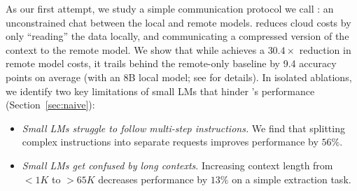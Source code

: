 As our first attempt, we study a simple communication protocol we call \naive: an unconstrained chat between the local and remote models. \naive reduces cloud costs by only ``reading'' the data locally, and communicating a compressed version of the context to the remote model. 
We show that while \naive achieves a $30.4\times$ reduction in remote model costs, it trails behind the remote-only baseline by 9.4 accuracy points on average (with an 8B local model; see  for details).
% 
In isolated ablations, we identify two key limitations of small LMs that hinder \naive's performance (Section~\ref{sec:naive}):
\begin{itemize}
        \item \emph{Small LMs struggle to follow multi-step instructions.} We find that splitting complex instructions into separate requests improves performance by $56\%$.
        \item \emph{Small LMs get confused by long contexts}. Increasing context length from $<1K$ to $>65K$ decreases performance by $13\%$ on a simple extraction task. 
\end{itemize}

